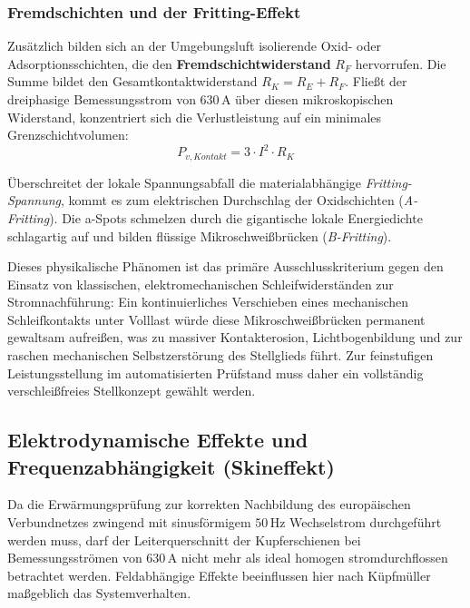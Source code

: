 \subsubsection{Fremdschichten und der Fritting-Effekt}
Zusätzlich bilden sich an der Umgebungsluft isolierende Oxid- oder Adsorptionsschichten, die den \textbf{Fremdschichtwiderstand} $R_F$ hervorrufen. Die Summe bildet den Gesamtkontaktwiderstand $R_K = R_E + R_F$. Fließt der dreiphasige Bemessungsstrom von $630\,\text{A}$ über diesen mikroskopischen Widerstand, konzentriert sich die Verlustleistung auf ein minimales Grenzschichtvolumen: 
\begin{equation}
    P_{v,Kontakt} = 3 \cdot I^2 \cdot R_K
\end{equation}

Überschreitet der lokale Spannungsabfall die materialabhängige \textit{Fritting-Spannung}, kommt es zum elektrischen Durchschlag der Oxidschichten (\textit{A-Fritting}). Die a-Spots schmelzen durch die gigantische lokale Energiedichte schlagartig auf und bilden flüssige Mikroschweißbrücken (\textit{B-Fritting}). 

Dieses physikalische Phänomen ist das primäre Ausschlusskriterium gegen den Einsatz von klassischen, elektromechanischen Schleifwiderständen zur Stromnachführung: Ein kontinuierliches Verschieben eines mechanischen Schleifkontakts unter Volllast würde diese Mikroschweißbrücken permanent gewaltsam aufreißen, was zu massiver Kontakterosion, Lichtbogenbildung und zur raschen mechanischen Selbstzerstörung des Stellglieds führt. Zur feinstufigen Leistungsstellung im automatisierten Prüfstand muss daher ein vollständig verschleißfreies Stellkonzept gewählt werden.

\subsection{Elektrodynamische Effekte und Frequenzabhängigkeit (Skineffekt)}
\label{sec:elektrodynamik}

Da die Erwärmungsprüfung zur korrekten Nachbildung des europäischen Verbundnetzes zwingend mit sinusförmigem $50\,\text{Hz}$ Wechselstrom durchgeführt werden muss, darf der Leiterquerschnitt der Kupferschienen bei Bemessungsströmen von $630\,\text{A}$ nicht mehr als ideal homogen stromdurchflossen betrachtet werden. Feldabhängige Effekte beeinflussen hier nach Küpfmüller \cite{Kuepfmueller_TET} maßgeblich das Systemverhalten.
